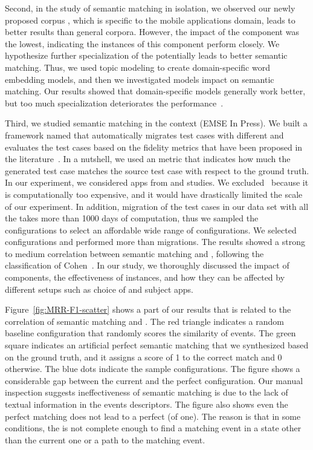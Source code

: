 \smallskip 
Second, in the study of semantic matching in isolation, we observed our newly proposed corpus \gp, which is specific to the mobile applications domain, leads to better results than general corpora.  
However, the impact of the \corpus component was the lowest, indicating the instances of this component perform closely. 
We hypothesize further specialization of the \corpus  potentially leads to better semantic matching.  
Thus, we used topic modeling to create domain-specific word embedding models, and then we investigated models  impact on semantic matching.
Our results showed that domain-specific models generally work better, but too much specialization deteriorates the performance~\cite{khalili:DomainEmbedding:ICPC:2022}.



\smallskip 
Third, we studied semantic matching in the \testreuse context (EMSE In Press).
We built a framework named \tme that automatically migrates test cases with different \smconfigs and evaluates the test cases based on the fidelity metrics that have been proposed in the literature~\cite{zhao:fruiter:fse:2020}.
In a nutshell, we used an \fscore metric that indicates how much the generated test case matches the source test case with respect to the ground truth.
In our experiment, we considered  \nexecapps apps from \atm and \craftdroid studies.
We excluded \adaptdroid~\selector because it is computationally too expensive, and it would have drastically limited the scale of our experiment.
In addition, migration of the test cases in our data set with all the \smconfigs takes more than 1000 days of computation, thus we sampled the configurations to select an affordable wide range of configurations.  
We selected \nsampledcomb configurations and performed more than \nmigrations migrations.
The results showed a strong to medium correlation between semantic matching and \testreuse, following the classification of Cohen~\cite{cohen:statisticalpower:Routledge:2013}.
In our study, we  thoroughly discussed the impact of components, the effectiveness of instances, and how they can be affected by different setups such as choice of \selector and subject apps.

\smallskip 
Figure~\ref{fig:MRR-F1-scatter} shows a part of our results that is related to the correlation of semantic matching and \testreuse.
The red triangle indicates a random baseline configuration that randomly scores the similarity of events.
The green square indicates an artificial perfect semantic matching that we synthesized based on the ground truth, and it  assigns a score of 1 to the correct match and 0 otherwise.
The blue dots indicate the sample configurations.
The figure shows a considerable gap between the current \smconfigs and the perfect configuration. 
Our manual inspection suggests ineffectiveness of semantic matching is due to the lack of textual information in the events descriptors.
The figure also shows even the perfect matching does not lead to a perfect \testreuse (\fscore of one).
The reason is that in some conditions, the \tam is not complete enough to find a matching event in a state other than the current one or a path to the matching event.




